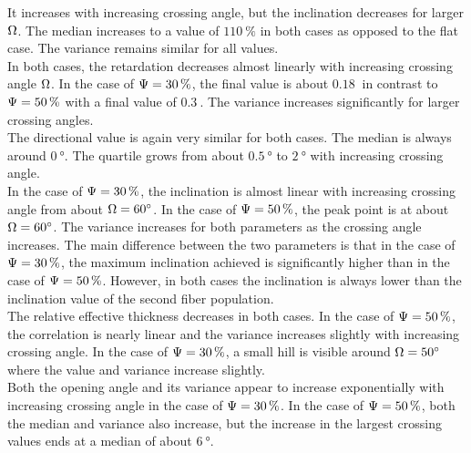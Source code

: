 It increases with increasing crossing angle, but the inclination decreases for larger $\textnormal{$\Omega$}$.
The median increases to a value of $\SI{110}{\percent}$ in both cases as opposed to the flat case.
The variance remains similar for all values.
\\
In both cases, the retardation decreases almost linearly with increasing crossing angle $\textnormal{$\Omega$}$.
In the case of $\textnormal{$\Psi$} = \SI{30}{\percent}$, the final value is about $\SI{0.18}{}$ in contrast to $\textnormal{$\Psi$} = \SI{50}{\percent}$ with a final value of $\SI{0.3}{}$.
The variance increases significantly for larger crossing angles.
\\
The directional value is again very similar for both cases.
The median is always around $\SI{0}{\degree}$.
The quartile grows from about $\SI{0.5}{\degree}$ to $\SI{2}{\degree}$ with increasing crossing angle.
\\
In the case of $\textnormal{$\Psi$} = \SI{30}{\percent}$, the inclination is almost linear with increasing crossing angle from about $\textnormal{$\Omega$} =\SI{60}{\degree}$.
In the case of $\textnormal{$\Psi$} = \SI{50}{\percent}$, the peak point is at about $\textnormal{$\Omega$} = \SI{60}{\degree}$.
The variance increases for both parameters as the crossing angle increases.
The main difference between the two parameters is that in the case of $\textnormal{$\Psi$} = \SI{30}{\percent}$, the maximum inclination achieved is significantly higher than in the case of $\textnormal{$\Psi$} = \SI{50}{\percent}$.
However, in both cases the inclination is always lower than the inclination value of the second fiber population.
\\
The relative effective thickness \trel{} decreases in both cases.
In the case of $\textnormal{$\Psi$} = \SI{50}{\percent}$, the correlation is nearly linear and the variance increases slightly with increasing crossing angle.
In the case of $\textnormal{$\Psi$} = \SI{30}{\percent}$, a small hill is visible around $\textnormal{$\Omega$} = \SI{50}{\degree}$ where the value and variance increase slightly.
\\
Both the opening angle and its variance appear to increase exponentially with increasing crossing angle in the case of $\textnormal{$\Psi$} = \SI{30}{\percent}$.
In the case of $\textnormal{$\Psi$} = \SI{50}{\percent}$, both the median and variance also increase, but the increase in the largest crossing values ends at a median of about $\SI{6}{\degree}$.
%
